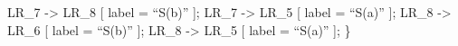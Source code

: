 \documentclass{article}
\begin{document}
   LR\_7 -\textgreater{} LR\_8 [ label = \textquotedblleft{}S(b)\textquotedblright{} ];
   LR\_7 -\textgreater{} LR\_5 [ label = \textquotedblleft{}S(a)\textquotedblright{} ];
   LR\_8 -\textgreater{} LR\_6 [ label = \textquotedblleft{}S(b)\textquotedblright{} ];
   LR\_8 -\textgreater{} LR\_5 [ label = \textquotedblleft{}S(a)\textquotedblright{} ];
\}%

\end{document}
